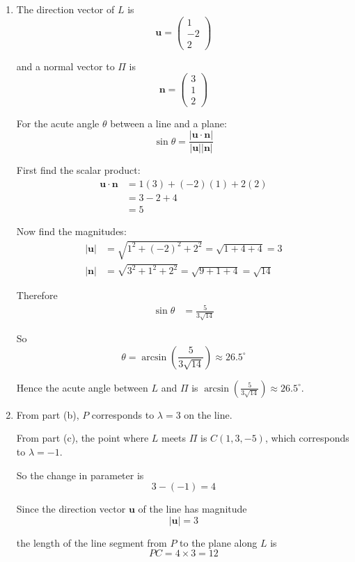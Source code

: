 \documentclass[leqno]{article}
\begin{document}
\begin{enumerate}[
  label=\textbf{\arabic*.},
  leftmargin=*,
  topsep=0pt,
  partopsep=0pt,
  parsep=0pt
]
\begin{djsSolution}
\begin{enumerate}[label=\textbf{(\alph*)}]
  \item The direction vector of $L$ is
\[
\mathbf u=\begin{pmatrix}1\\-2\\2\end{pmatrix}
\]

and a normal vector to $\Pi$ is
\[
\mathbf n=\begin{pmatrix}3\\1\\2\end{pmatrix}
\]

For the acute angle $\theta$ between a line and a plane:
\[
\sin\theta=\frac{\left\lvert \mathbf u\cdot\mathbf n\right\rvert}{\left\lvert \mathbf u\right\rvert\left\lvert \mathbf n\right\rvert}
\]

First find the scalar product:
\begin{align*}
\mathbf u\cdot\mathbf n
&=1(3)+(-2)(1)+2(2)\\
&=3-2+4\\
&=5
\end{align*}

Now find the magnitudes:
\begin{align*}
\left\lvert \mathbf u\right\rvert
&=\sqrt{1^2+(-2)^2+2^2}
=\sqrt{1+4+4}
=3\\
\left\lvert \mathbf n\right\rvert
&=\sqrt{3^2+1^2+2^2}
=\sqrt{9+1+4}
=\sqrt{14}
\end{align*}

Therefore
\begin{align*}
\sin\theta
&=\frac{5}{3\sqrt{14}}
\end{align*}

So
\[
\theta=\arcsin\left(\frac{5}{3\sqrt{14}}\right)\approx 26.5^\circ
\]

Hence the acute angle between $L$ and $\Pi$ is $\arcsin\left(\frac{5}{3\sqrt{14}}\right)\approx 26.5^\circ$.

  \item From part (b), $P$ corresponds to $\lambda=3$ on the line.

From part (c), the point where $L$ meets $\Pi$ is $C(1,3,-5)$, which corresponds to $\lambda=-1$.

So the change in parameter is
\[
3-(-1)=4
\]

Since the direction vector $\mathbf u$ of the line has magnitude
\[
\left\lvert \mathbf u\right\rvert=3
\]

the length of the line segment from $P$ to the plane along $L$ is
\[
PC=4\times 3=12
\]


\end{enumerate}
\end{djsSolution}
\end{enumerate}
\end{document}
